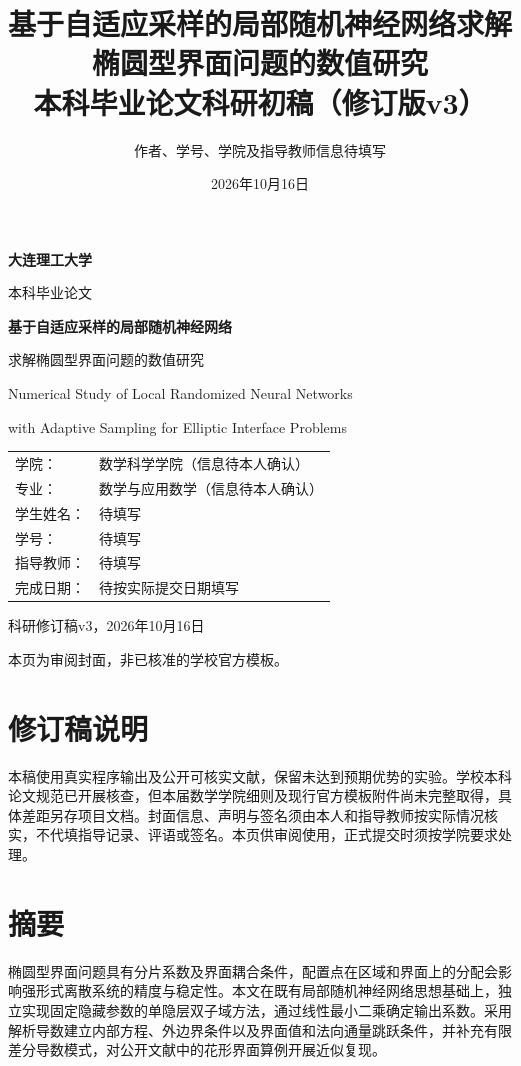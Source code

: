 \documentclass[UTF8,12pt,oneside]{ctexbook}
\title{基于自适应采样的局部随机神经网络求解椭圆型界面问题的数值研究\\[1em]\large 本科毕业论文科研初稿（修订版v3）}
\author{作者、学号、学院及指导教师信息待填写}
\date{2026年10月16日}
\theoremstyle{definition}
\begin{document}
\frontmatter
\begin{titlepage}
\centering
{\sffamily\bfseries\LARGE 大连理工大学\par}
\vspace{1.0cm}
{\sffamily\Large 本科毕业论文\par}
\vspace{1.2cm}
{\sffamily\bfseries\Large 基于自适应采样的局部随机神经网络\par
求解椭圆型界面问题的数值研究\par}
\vspace{0.7cm}
{\large Numerical Study of Local Randomized Neural Networks\par
with Adaptive Sampling for Elliptic Interface Problems\par}
\vspace{1.2cm}
\begin{tabular}{ll}
学院：& 数学科学学院（信息待本人确认）\\[.5em]
专业：& 数学与应用数学（信息待本人确认）\\[.5em]
学生姓名：& 待填写\\[.5em]
学号：& 待填写\\[.5em]
指导教师：& 待填写\\[.5em]
完成日期：& 待按实际提交日期填写
\end{tabular}
\vfill
{科研修订稿v3，2026年10月16日\par}
\small 本页为审阅封面，非已核准的学校官方模板。\par
\end{titlepage}
\chapter*{修订稿说明}
本稿使用真实程序输出及公开可核实文献，保留未达到预期优势的实验。学校本科论文规范已开展核查，但本届数学学院细则及现行官方模板附件尚未完整取得，具体差距另存项目文档。封面信息、声明与签名须由本人和指导教师按实际情况核实，不代填指导记录、评语或签名。本页供审阅使用，正式提交时须按学院要求处理。

\chapter*{摘要}
椭圆型界面问题具有分片系数及界面耦合条件，配置点在区域和界面上的分配会影响强形式离散系统的精度与稳定性。本文在既有局部随机神经网络思想基础上，独立实现固定隐藏参数的单隐层双子域方法，通过线性最小二乘确定输出系数。采用解析导数建立内部方程、外边界条件以及界面值和法向通量跳跃条件，并补充有限差分导数模式，对公开文献中的花形界面算例开展近似复现。
\end{document}
